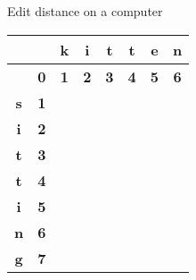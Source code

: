 
\begin{frame}{Edit distance on a computer}
\begin{table}
\begin{tabular}{|c|c||c|c|c|c|c|c|} \hline
           &            & \textbf{k} & \textbf{i} & \textbf{t} & \textbf{t} & \textbf{e} & \textbf{n} \\ \hline
           & \textbf{0} & \textbf{1} & \textbf{2} & \textbf{3} & \textbf{4} & \textbf{5} & \textbf{6} \\ \hline \hline
\textbf{s} & \textbf{1} &            &            &            &            &            &            \\ \hline
\textbf{i} & \textbf{2} &            &            &            &            &            &            \\ \hline
\textbf{t} & \textbf{3} &            &            &            &            &            &            \\ \hline
\textbf{t} & \textbf{4} &            &            &            &            &            &            \\ \hline
\textbf{i} & \textbf{5} &            &            &            &            &            &            \\ \hline
\textbf{n} & \textbf{6} &            &            &            &            &            &            \\ \hline
\textbf{g} & \textbf{7} &            &            &            &            &            &            \\ \hline
\end{tabular}
\end{table}
\end{frame}

